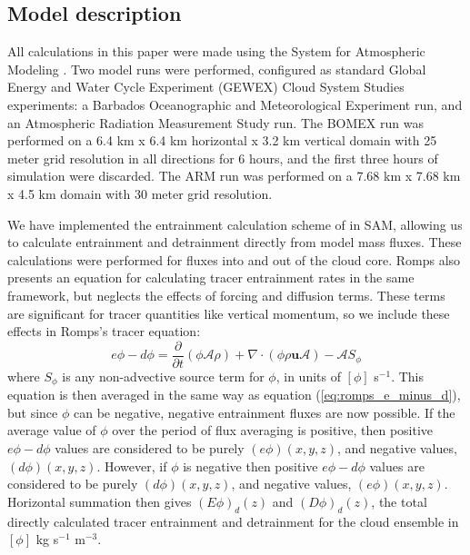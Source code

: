 \documentclass[draft,grl]{agutex}
\begin{document}
\begin{article}

\section{Model description}

All calculations in this paper were made using the System for Atmospheric 
Modeling \citep[SAM;][]{Khairoutdinov2003}.  Two model runs were performed, 
configured as standard Global Energy and Water Cycle Experiment (GEWEX) 
Cloud System Studies \citep[GCSS;][]{Randall2003} experiments: a Barbados 
Oceanographic and Meteorological Experiment \citep[BOMEX;][]{Siebesma2003} run,
and an Atmospheric Radiation Measurement Study \citep[ARM;][]{Brown2002} run. 
The BOMEX run was performed on a 6.4 km x 6.4 km horizontal x 3.2 km vertical 
domain with 25 meter grid resolution in all directions for 6 hours, and the 
first three hours of simulation were discarded. The ARM run was performed on a 
7.68 km x 7.68 km x 4.5 km domain with 30 meter grid resolution.

We have implemented the entrainment calculation scheme of \cite{Romps2010} in 
SAM, allowing us to calculate entrainment and detrainment directly from model 
mass fluxes.  These calculations were performed for fluxes into and out of the 
cloud core.  Romps also presents an equation for calculating tracer entrainment 
rates in the same framework, but neglects the effects of forcing and diffusion 
terms.  These terms are significant for tracer quantities like vertical 
momentum, so we include these effects in Romps's tracer equation:
\begin{equation}
  \label{eq:romps_ephi_minus_dphi}
  e\phi - d\phi = \frac{\partial}{\partial t}(\phi \mathcal{A} \rho) 
                + \nabla \cdot (\phi \rho \mathbf{u} \mathcal{A})
                - \mathcal{A}S_\phi
\end{equation}
where $S_\phi$ is any non-advective source term for $\phi$, in units of 
$[\phi]$ s$^{-1}$.  This equation is then averaged in the same way as equation 
(\ref{eq:romps_e_minus_d}), but since $\phi$ can be negative, negative 
entrainment fluxes are now possible.  If the average value of $\phi$ over the 
period of flux averaging is positive, then positive $e\phi-d\phi$ values are 
considered to be purely $(e\phi)(x,y,z)$, and negative values, 
$(d\phi)(x,y,z)$.  However, if $\phi$ is negative then positive $e\phi-d\phi$ 
values are considered to be purely $(d\phi)(x,y,z)$, and negative values, 
$(e\phi)(x,y,z)$.  Horizontal summation then gives $(E\phi)_d(z)$ and 
$(D\phi)_d(z)$, the total directly calculated tracer entrainment and 
detrainment for the cloud ensemble in $[\phi]$ kg s$^{-1}$ m$^{-3}$.


\end{article}
\end{document}
